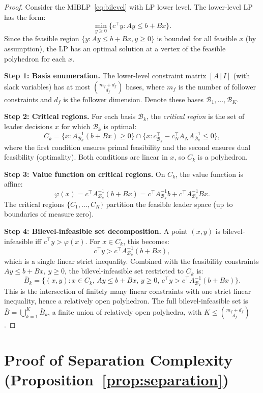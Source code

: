 \documentclass[11pt]{article}
\begin{document}
\begin{proof}
Consider the MIBLP~\eqref{eq:bilevel} with LP lower level. The lower-level
LP has the form:
\[
\min_{y \geq 0} \{c^\top y : Ay \leq b + Bx\}.
\]
Since the feasible region $\{y : Ay \leq b + Bx, y \geq 0\}$ is bounded
for all feasible $x$ (by assumption), the LP has an optimal solution at
a vertex of the feasible polyhedron for each $x$.

\textbf{Step 1: Basis enumeration.}
The lower-level constraint matrix $[A \,|\, I]$ (with slack variables) has
at most $\binom{m_f + d_f}{d_f}$ bases, where $m_f$ is the number of
follower constraints and $d_f$ is the follower dimension. Denote these
bases $\mathcal{B}_1, \ldots, \mathcal{B}_K$.

\textbf{Step 2: Critical regions.}
For each basis $\mathcal{B}_k$, the \emph{critical region} is the set of
leader decisions $x$ for which $\mathcal{B}_k$ is optimal:
\[
C_k = \{x : A_{\mathcal{B}_k}^{-1}(b + Bx) \geq 0\} \cap
\{x : c^\top_{\mathcal{B}_k} - c^\top_N A_N A_{\mathcal{B}_k}^{-1} \leq 0\},
\]
where the first condition ensures primal feasibility and the second ensures
dual feasibility (optimality). Both conditions are linear in $x$, so $C_k$
is a polyhedron.

\textbf{Step 3: Value function on critical regions.}
On $C_k$, the value function is affine:
\[
\varphi(x) = c^\top A_{\mathcal{B}_k}^{-1}(b + Bx) = c^\top A_{\mathcal{B}_k}^{-1}b + c^\top A_{\mathcal{B}_k}^{-1}Bx.
\]
The critical regions $\{C_1, \ldots, C_K\}$ partition the feasible leader
space (up to boundaries of measure zero).

\textbf{Step 4: Bilevel-infeasible set decomposition.}
A point $(x, y)$ is bilevel-infeasible iff $c^\top y > \varphi(x)$.
For $x \in C_k$, this becomes:
\[
c^\top y > c^\top A_{\mathcal{B}_k}^{-1}(b + Bx),
\]
which is a single linear strict inequality. Combined with the feasibility
constraints $Ay \leq b + Bx$, $y \geq 0$, the bilevel-infeasible set
restricted to $C_k$ is:
\[
\bar{B}_k = \{(x,y) : x \in C_k,\, Ay \leq b + Bx,\, y \geq 0,\,
c^\top y > c^\top A_{\mathcal{B}_k}^{-1}(b + Bx)\}.
\]
This is the intersection of finitely many linear constraints with one strict
linear inequality, hence a relatively open polyhedron. The full
bilevel-infeasible set is $\bar{B} = \bigcup_{k=1}^K \bar{B}_k$, a finite
union of relatively open polyhedra, with $K \leq \binom{m_f + d_f}{d_f}$.
\end{proof}

\section{Proof of Separation Complexity (Proposition~\ref{prop:separation})}
\label{app:separation}
\end{document}
